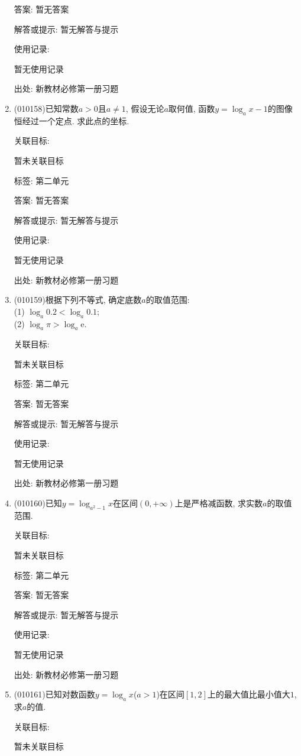 \documentclass[10pt,a4paper]{article}
\begin{document}
\begin{enumerate}[1.]
答案: 暂无答案

解答或提示: 暂无解答与提示

使用记录:

暂无使用记录


出处: 新教材必修第一册习题
\item { (010158)}已知常数$a>0$且$a\ne 1$, 假设无论$a$取何值, 函数$y=\log_ax-1$的图像恒经过一个定点. 求此点的坐标.


关联目标:

暂未关联目标



标签: 第二单元

答案: 暂无答案

解答或提示: 暂无解答与提示

使用记录:

暂无使用记录


出处: 新教材必修第一册习题
\item { (010159)}根据下列不等式, 确定底数$a$的取值范围:\\
(1) $\log_a 0.2<\log_a 0.1$;\\
(2) $\log_a\pi >\log_a\mathrm{e}$.


关联目标:

暂未关联目标



标签: 第二单元

答案: 暂无答案

解答或提示: 暂无解答与提示

使用记录:

暂无使用记录


出处: 新教材必修第一册习题
\item { (010160)}已知$y=\log_{a^2-1}x$在区间$(0, +\infty)$上是严格减函数, 求实数$a$的取值范围.


关联目标:

暂未关联目标



标签: 第二单元

答案: 暂无答案

解答或提示: 暂无解答与提示

使用记录:

暂无使用记录


出处: 新教材必修第一册习题
\item { (010161)}已知对数函数$y=\log_ax$($a>1$)在区间$[1, 2]$上的最大值比最小值大$1$, 求$a$的值.


关联目标:

暂未关联目标




\end{enumerate}
\end{document}

